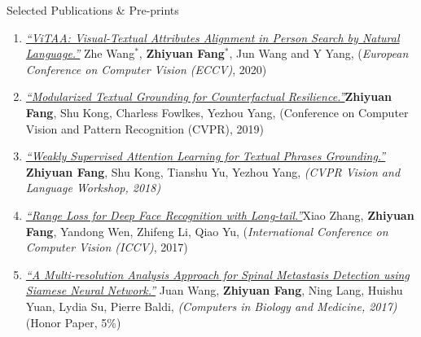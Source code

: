 \documentclass{resume} %
\begin{document}
\begin{rSection}{Selected Publications \& Pre-prints}
\begin{enumerate}
    \item \href{https://arxiv.org/abs/2005.07327}{\textit{``ViTAA: Visual-Textual Attributes Alignment in Person Search by Natural Language.''}} {Zhe Wang$^*$, \textbf{{Zhiyuan Fang$^*$}}, Jun Wang and Y Yang, ({\textit{European Conference on Computer Vision (ECCV)}}, 2020)}
    
    \item \href{https://openaccess.thecvf.com/content_CVPR_2019/papers/Fang_Modularized_Textual_Grounding_for_Counterfactual_Resilience_CVPR_2019_paper.pdf}{\textit{``Modularized Textual Grounding for Counterfactual Resilience.''}}{\textbf{Zhiyuan Fang}, Shu Kong, Charless Fowlkes, Yezhou Yang, ({Conference on Computer Vision and Pattern Recognition (CVPR)}, 2019)}
    
    
    \item \href{https://arxiv.org/abs/1805.00545} {\textit{``Weakly Supervised Attention Learning for Textual Phrases Grounding.''}} {\textbf{{Zhiyuan Fang}}, Shu Kong, Tianshu Yu, Yezhou Yang, \textit{({CVPR Vision and Language Workshop}, 2018)}}
    
    \item \href{https://arxiv.org/abs/1611.08976} {\textit{``Range Loss for Deep Face Recognition with Long-tail.''}}{Xiao Zhang, \textbf{{Zhiyuan Fang}}, Yandong Wen, Zhifeng Li, Qiao Yu, ({\textit{International Conference on Computer Vision (ICCV)}}, 2017)}
    
    \item \href{http://www.sciencedirect.com/science/article/pii/S0010482517300793} {\textit{``A Multi-resolution Analysis Approach for Spinal Metastasis Detection using Siamese Neural Network.''}} {Juan Wang, \textbf{{Zhiyuan Fang}}, Ning Lang,  Huishu Yuan, Lydia Su,  Pierre Baldi,
    \textit{{(Computers in Biology and Medicine}, 2017)}}(Honor Paper, 5\%)

\end{enumerate}


\end{rSection}
\end{document}

